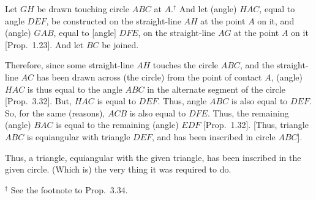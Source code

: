 \begin{Parallel}{}{}
{Let $GH$ be drawn touching circle $ABC$ at $A$.$^\dag$ And let  (angle) $HAC$, equal to angle $DEF$,  be constructed
on the straight-line $AH$ at the point $A$ on it, and (angle) $GAB$, equal to
[angle] $DFE$,  on the straight-line $AG$ at the point $A$ on it
 [Prop.~1.23]. And let $BC$ be joined.
 
 Therefore, since some straight-line $AH$ touches the circle $ABC$, and the
 straight-line $AC$ has been drawn across (the circle) from the point of
 contact $A$, (angle) $HAC$ is thus equal to the angle $ABC$ in the alternate
 segment of the circle [Prop.~3.32]. But, $HAC$ is equal to $DEF$.
 Thus, angle $ABC$ is also equal to $DEF$. So, for the same (reasons),
 $ACB$ is also equal to $DFE$.  Thus, the remaining (angle) $BAC$ is equal
 to the remaining (angle) $EDF$ [Prop.~1.32]. [Thus, triangle
 $ABC$ is equiangular with triangle $DEF$, and has been inscribed in circle
 $ABC$].
 
 Thus, a triangle, equiangular with the given triangle, has been inscribed in
 the given circle. (Which is) the very thing it was required to do.}
\end{Parallel}
{\footnotesize \noindent$^\dag$ See the footnote
to Prop.~3.34.}

